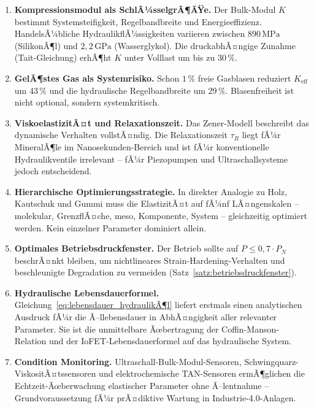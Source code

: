 ﻿\documentclass[a4paper,12pt]{scrreprt}
\theoremstyle{definition}
\begin{document}
\begin{enumerate}
  \item \textbf{Kompressionsmodul als SchlÃ¼sselgrÃ¶ÃŸe.}
    Der Bulk-Modul $K$ bestimmt Systemsteifigkeit, Regelbandbreite und
    Energieeffizienz. HandelsÃ¼bliche HydraulikflÃ¼ssigkeiten variieren
    zwischen $890\,\mathrm{MPa}$ (SilikonÃ¶l) und $2{,}2\,\mathrm{GPa}$
    (Wasserglykol). Die druckabhÃ¤ngige Zunahme (Tait-Gleichung) erhÃ¶ht
    $K$ unter Volllast um bis zu $30\,\%$.

  \item \textbf{GelÃ¶stes Gas als Systemrisiko.}
    Schon $1\,\%$ freie Gasblasen reduziert $K_{\mathrm{eff}}$ um $43\,\%$
    und die hydraulische Regelbandbreite um $29\,\%$. Blasenfreiheit ist
    nicht optional, sondern systemkritisch.

  \item \textbf{ViskoelastizitÃ¤t und Relaxationszeit.}
    Das Zener-Modell beschreibt das dynamische Verhalten vollstÃ¤ndig.
    Die Relaxationszeit $\tau_R$ liegt fÃ¼r MineralÃ¶le im Nanosekunden-Bereich
    und ist fÃ¼r konventionelle Hydraulikventile irrelevant -- fÃ¼r
    Piezopumpen und Ultraschallsysteme jedoch entscheidend.

  \item \textbf{Hierarchische Optimierungsstrategie.}
    In direkter Analogie zu Holz, Kautschuk und Gummi muss die ElastizitÃ¤t
    auf fÃ¼nf LÃ¤ngenskalen -- molekular, GrenzflÃ¤che, meso, Komponente,
    System -- gleichzeitig optimiert werden. Kein einzelner Parameter
    dominiert allein.

  \item \textbf{Optimales Betriebsdruckfenster.}
    Der Betrieb sollte auf $P \leq 0{,}7 \cdot P_N$ beschrÃ¤nkt bleiben,
    um nichtlineares Strain-Hardening-Verhalten und beschleunigte
    Degradation zu vermeiden (Satz~\ref{satz:betriebsdruckfenster}).

  \item \textbf{Hydraulische Lebensdauerformel.}
    Gleichung~\eqref{eq:lebensdauer_hydraulikÃ¶l} liefert erstmals einen
    analytischen Ausdruck fÃ¼r die Ã–llebensdauer in AbhÃ¤ngigkeit aller
    relevanter Parameter. Sie ist die unmittelbare Ãœbertragung der
    Coffin-Manson-Relation und der IoFET-Lebensdauerformel auf das
    hydraulische System.

  \item \textbf{Condition Monitoring.}
    Ultraschall-Bulk-Modul-Sensoren, Schwingquarz-Viskosi\-tÃ¤tssensoren und
    elektrochemische TAN-Sensoren ermÃ¶glichen die Echtzeit-Ãœber\-wachung
    elastischer Parameter ohne Ã–lentnahme -- Grundvoraussetzung fÃ¼r
    prÃ¤diktive Wartung in Industrie-4.0-Anlagen.


\end{enumerate}
\end{document}
